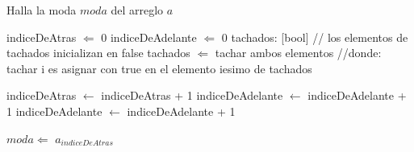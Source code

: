 \begin{algorithm}
\caption{Halla la moda $moda$ del arreglo $a$}
\begin{algorithmic}[1]
\STATE indiceDeAtras $\Leftarrow$ 0
\STATE indiceDeAdelante $\Leftarrow$ 0
\STATE tachados: [bool] // los elementos de tachados inicializan en false
        \STATE tachados $\Leftarrow$ tachar ambos elementos //donde: tachar i es asignar con true en el elemento iesimo de tachados

            \STATE indiceDeAtras $\leftarrow$ indiceDeAtras + 1
        \ENDWHILE
            \STATE indiceDeAdelante $\leftarrow$ indiceDeAdelante + 1
        \ENDWHILE
    \ELSE
        \STATE indiceDeAdelante $\leftarrow$ indiceDeAdelante + 1
    \ENDIF

\ENDWHILE
\STATE $moda \Leftarrow$ $a_{indiceDeAtras}$
\end{algorithmic}
\end{algorithm}
